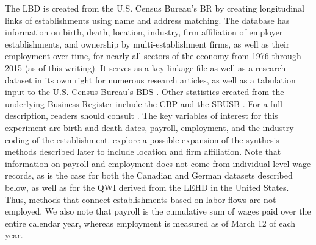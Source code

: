 The \ac{LBD} \citep{LBD} is created from the U.S. Census Bureau's \ac{BR} by creating longitudinal links of establishments using name and address matching. The database has information on birth, death, location, industry,  firm  affiliation of employer establishments, and ownership by multi-establishment firms, as well as their employment over time, for nearly all sectors of the economy from 1976 through 2015 (as of this writing). It serves as a key linkage file as well as a research dataset in its own right for numerous research articles, as well as a tabulation input to the U.S. Census Bureau's \acl{BDS} \citep[\acs{BDS}]{BDS}. Other statistics created from the underlying Business Register include the \acl{CBP} \citep[\acs{CBP}]{CBP} and the \acl{SBUSB} \citep[\acs{SBUSB}]{SBUSB}. For a full description, readers should consult  \citet{RePEc:cen:wpaper:02-17,}. The key variables of interest for this experiment are birth and death dates, payroll, employment, and the industry coding of the establishment.  \citet{SJIAOS-2014d} explore a possible expansion of the synthesis methods described later to include location and firm affiliation. Note that information on payroll and employment does not come from individual-level wage records, as is the case for both the Canadian and German datasets described below, as well as for the \acl{QWI} \citep{AbowdEtAl2009} derived from the \acl{LEHD} \citep[LEHD]{RePEc:cen:wpaper:18-27} in the United States.  Thus, methods that connect establishments based on labor flows \citep{BenedettoEtAl2007,RePEc:iab:iabfme:201006_en} are not employed. We also note that payroll is the cumulative sum of wages paid over the entire calendar year, whereas employment is measured as of March 12 of each year.



